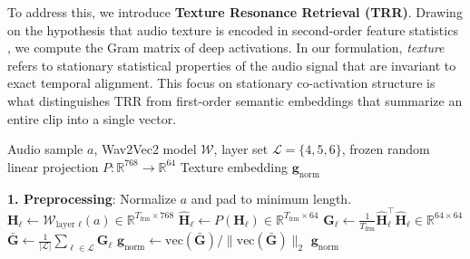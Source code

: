To address this, we introduce \textbf{Texture Resonance Retrieval (TRR)}. Drawing on the hypothesis that audio texture is encoded in second-order feature statistics \citep{mcdermott2011sound}, we compute the Gram matrix of deep activations. In our formulation, \textit{texture} refers to stationary statistical properties of the audio signal that are invariant to exact temporal alignment. This focus on stationary co-activation structure is what distinguishes TRR from first-order semantic embeddings that summarize an entire clip into a single vector.

\begin{algorithm}[ht]
		\caption{TRR Encoding}
		\label{alg:trr_encoding}
		\begin{algorithmic}
			\REQUIRE Audio sample $a$, Wav2Vec2 model $\mathcal{W}$, layer set $\mathcal{L}=\{4,5,6\}$, frozen random linear projection $P:\mathbb{R}^{768}\rightarrow\mathbb{R}^{64}$
			\ENSURE Texture embedding $\mathbf{g}_{\text{norm}}$

			\STATE \textbf{1. Preprocessing}: Normalize $a$ and pad to minimum length.
			\STATE $\mathbf{H}_{\ell} \leftarrow \mathcal{W}_{\text{layer }\ell}(a) \in \mathbb{R}^{T_{\text{frm}} \times 768}$
			\STATE $\widehat{\mathbf{H}}_{\ell} \leftarrow P(\mathbf{H}_{\ell}) \in \mathbb{R}^{T_{\text{frm}} \times 64}$ 
			\STATE $\mathbf{G}_{\ell} \leftarrow \frac{1}{T_{\text{frm}}}\widehat{\mathbf{H}}_{\ell}^{\top}\widehat{\mathbf{H}}_{\ell} \in \mathbb{R}^{64 \times 64}$
			\ENDFOR
			\STATE $\bar{\mathbf{G}} \leftarrow \frac{1}{|\mathcal{L}|}\sum_{\ell\in\mathcal{L}}\mathbf{G}_{\ell}$
			\STATE $\mathbf{g}_{\text{norm}} \leftarrow \mathrm{vec}(\bar{\mathbf{G}}) / \|\mathrm{vec}(\bar{\mathbf{G}})\|_2$
		\RETURN $\mathbf{g}_{\text{norm}}$
	\end{algorithmic}
\end{algorithm}

